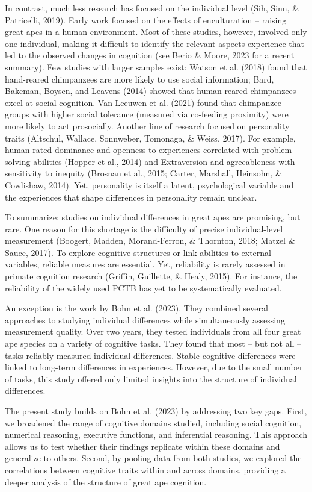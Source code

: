 \documentclass[
  man,floatsintext]{apa6}
\begin{document}
In contrast, much less research has focused on the individual level (Sih, Sinn, \& Patricelli, 2019). Early work focused on the effects of enculturation -- raising great apes in a human environment. Most of these studies, however, involved only one individual, making it difficult to identify the relevant aspects experience that led to the observed changes in cognition (see Berio \& Moore, 2023 for a recent summary). Few studies with larger samples exist: Watson et al. (2018) found that hand-reared chimpanzees are more likely to use social information; Bard, Bakeman, Boysen, and Leavens (2014) showed that human-reared chimpanzees excel at social cognition. Van Leeuwen et al. (2021) found that chimpanzee groups with higher social tolerance (measured via co-feeding proximity) were more likely to act prosocially. Another line of research focused on personality traits (Altschul, Wallace, Sonnweber, Tomonaga, \& Weiss, 2017). For example, human-rated dominance and openness to experiences correlated with problem-solving abilities (Hopper et al., 2014) and Extraversion and agreeableness with sensitivity to inequity (Brosnan et al., 2015; Carter, Marshall, Heinsohn, \& Cowlishaw, 2014). Yet, personality is itself a latent, psychological variable and the experiences that shape differences in personality remain unclear.

To summarize: studies on individual differences in great apes are promising, but rare. One reason for this shortage is the difficulty of precise individual-level measurement (Boogert, Madden, Morand-Ferron, \& Thornton, 2018; Matzel \& Sauce, 2017). To explore cognitive structures or link abilities to external variables, reliable measures are essential. Yet, reliability is rarely assessed in primate cognition research (Griffin, Guillette, \& Healy, 2015). For instance, the reliability of the widely used PCTB has yet to be systematically evaluated.

An exception is the work by Bohn et al. (2023). They combined several approaches to studying individual differences while simultaneously assessing measurement quality. Over two years, they tested individuals from all four great ape species on a variety of cognitive tasks. They found that most -- but not all -- tasks reliably measured individual differences. Stable cognitive differences were linked to long-term differences in experiences. However, due to the small number of tasks, this study offered only limited insights into the structure of individual differences.

The present study builds on Bohn et al. (2023) by addressing two key gaps. First, we broadened the range of cognitive domains studied, including social cognition, numerical reasoning, executive functions, and inferential reasoning. This approach allows us to test whether their findings replicate within these domains and generalize to others. Second, by pooling data from both studies, we explored the correlations between cognitive traits within and across domains, providing a deeper analysis of the structure of great ape cognition.
\end{document}
